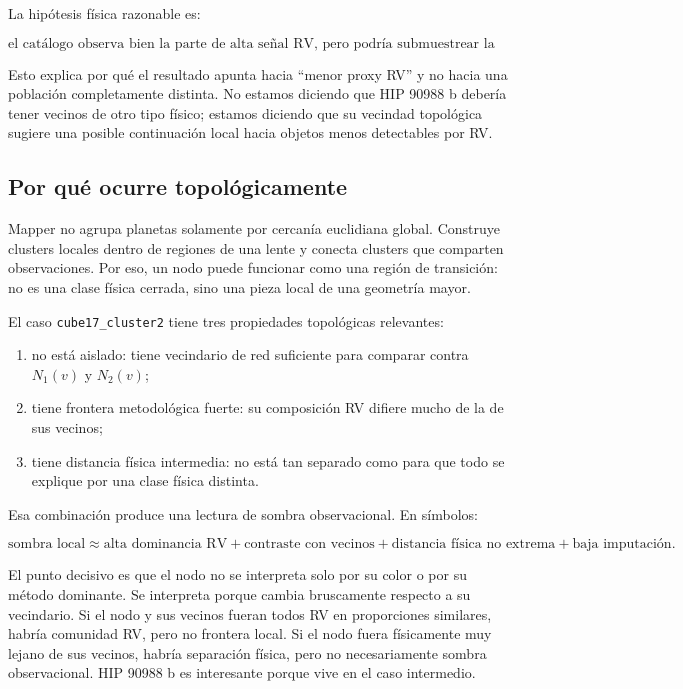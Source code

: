 \documentclass[11pt]{article}
\begin{document}
La hipótesis física razonable es:

\[
\boxed{
\text{el catálogo observa bien la parte de alta señal RV, pero podría submuestrear la extensión de menor masa.}
}
\]

Esto explica por qué el resultado apunta hacia ``menor proxy RV'' y no hacia una población completamente distinta. No estamos diciendo que HIP 90988 b debería tener vecinos de otro tipo físico; estamos diciendo que su vecindad topológica sugiere una posible continuación local hacia objetos menos detectables por RV.

\subsection{Por qué ocurre topológicamente}

Mapper no agrupa planetas solamente por cercanía euclidiana global. Construye clusters locales dentro de regiones de una lente y conecta clusters que comparten observaciones. Por eso, un nodo puede funcionar como una región de transición: no es una clase física cerrada, sino una pieza local de una geometría mayor.

El caso \texttt{cube17\_cluster2} tiene tres propiedades topológicas relevantes:

\begin{enumerate}
    \item no está aislado: tiene vecindario de red suficiente para comparar contra $N_1(v)$ y $N_2(v)$;
    \item tiene frontera metodológica fuerte: su composición RV difiere mucho de la de sus vecinos;
    \item tiene distancia física intermedia: no está tan separado como para que todo se explique por una clase física distinta.
\end{enumerate}

Esa combinación produce una lectura de sombra observacional. En símbolos:

\[
\text{sombra local}
\approx
\text{alta dominancia RV}
+
\text{contraste con vecinos}
+
\text{distancia física no extrema}
+
\text{baja imputación}.
\]

El punto decisivo es que el nodo no se interpreta solo por su color o por su método dominante. Se interpreta porque cambia bruscamente respecto a su vecindario. Si el nodo y sus vecinos fueran todos RV en proporciones similares, habría comunidad RV, pero no frontera local. Si el nodo fuera físicamente muy lejano de sus vecinos, habría separación física, pero no necesariamente sombra observacional. HIP 90988 b es interesante porque vive en el caso intermedio.
\end{document}
